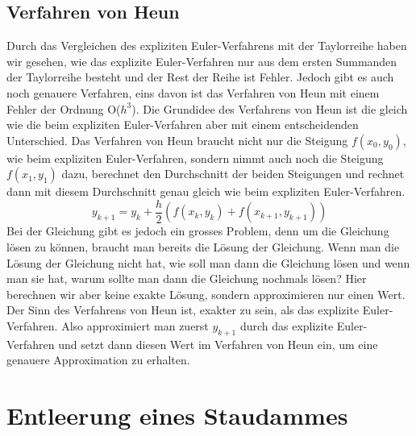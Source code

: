 \documentclass[a4paper,12pt]{report}
\begin{document}
\section{Verfahren von Heun}\label{Heun}
Durch das Vergleichen des expliziten Euler-Verfahrens mit der Taylorreihe haben wir gesehen, wie das explizite Euler-Verfahren nur aus dem ersten Summanden der Taylorreihe besteht und der Rest der Reihe ist Fehler. Jedoch gibt es auch noch genauere Verfahren, eins davon ist das Verfahren von Heun mit einem Fehler der Ordnung O($h^3$). Die Grundidee des Verfahrens von Heun ist die gleich wie die beim expliziten Euler-Verfahren aber mit einem entscheidenden Unterschied. Das Verfahren von Heun braucht nicht nur die Steigung $f(x_0, y_0)$, wie beim expliziten Euler-Verfahren, sondern nimmt auch noch die Steigung $f(x_1, y_1)$ dazu, berechnet den Durchschnitt der beiden Steigungen und rechnet dann mit diesem Durchschnitt genau gleich wie beim expliziten Euler-Verfahren.
\begin{equation*}
y_{k+1} = y_k + \frac{h}{2}(f(x_k, y_k) + f(x_{k+1}, y_{k+1}))
\end{equation*}
Bei der Gleichung gibt es jedoch ein grosses Problem, denn um die Gleichung lösen zu können, braucht man bereits die Lösung der Gleichung. Wenn man die Lösung der Gleichung nicht hat, wie soll man dann die Gleichung lösen und wenn man sie hat, warum sollte man dann die Gleichung nochmals lösen? Hier berechnen wir aber keine exakte Lösung, sondern approximieren nur einen Wert. Der Sinn des Verfahrens von Heun ist, exakter zu sein, als das explizite Euler-Verfahren. Also approximiert man zuerst $y_{k+1}$ durch das explizite Euler-Verfahren und setzt dann diesen Wert im Verfahren von Heun ein, um eine genauere Approximation zu erhalten. \cite[Schwarz S.420-424]{Schwarz}

\chapter{Entleerung eines Staudammes}\label{Staudam}
\end{document}

